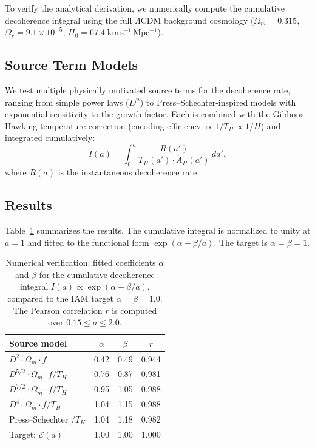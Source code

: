 \documentclass[11pt]{article}
\begin{document}
To verify the analytical derivation, we numerically compute the cumulative
decoherence integral using the full $\Lambda$CDM background cosmology
($\Omega_m = 0.315$, $\Omega_r = 9.1\times 10^{-5}$,
$H_0 = 67.4\;\mathrm{km\,s^{-1}\,Mpc^{-1}}$).

\subsection{Source Term Models}

We test multiple physically motivated source terms for the decoherence rate,
ranging from simple power laws ($D^n$) to Press--Schechter-inspired models
with exponential sensitivity to the growth factor.  Each is combined with the
Gibbons--Hawking temperature correction (encoding efficiency
$\propto 1/T_H \propto 1/H$) and integrated cumulatively:
\begin{equation}
I(a) = \int_0^a \frac{R(a')}{T_H(a')\cdot A_H(a')}\,da',
\end{equation}
where $R(a)$ is the instantaneous decoherence rate.

\subsection{Results}

Table~\ref{tab:numerical_results} summarizes the results.  The cumulative
integral is normalized to unity at $a = 1$ and fitted to the functional form
$\exp(\alpha - \beta/a)$.  The target is $\alpha = \beta = 1$.

\begin{table}[h]
\centering
\caption{Numerical verification: fitted coefficients $\alpha$ and $\beta$
for the cumulative decoherence integral
$I(a) \propto \exp(\alpha - \beta/a)$, compared to the IAM target
$\alpha = \beta = 1.0$.  The Pearson correlation $r$ is computed over
$0.15 \leq a \leq 2.0$.}
\begin{tabular}{lccc}
\hline
Source model & $\alpha$ & $\beta$ & $r$ \\
\hline
$D^2 \cdot \Omega_m \cdot f$ & 0.42 & 0.49 & 0.944 \\
$D^{5/2} \cdot \Omega_m \cdot f / T_H$ & 0.76 & 0.87 & 0.981 \\
$D^{7/2} \cdot \Omega_m \cdot f / T_H$ & 0.95 & 1.05 & 0.988 \\
$D^4 \cdot \Omega_m \cdot f / T_H$ & 1.04 & 1.15 & 0.988 \\
Press--Schechter $/ T_H$ & 1.04 & 1.18 & 0.982 \\
\hline
Target: $\mathcal{E}(a)$ & 1.00 & 1.00 & 1.000 \\
\hline
\end{tabular}
\label{tab:numerical_results}
\end{table}
\end{document}

